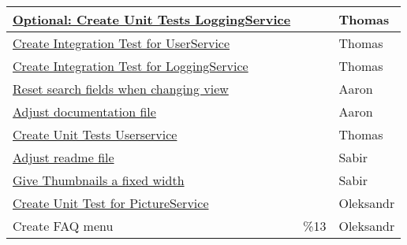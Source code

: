 \begin{tabular}{|p{}|p{1cm}|p{}|}
    \hline
	\href{https://gitlab.rz.uni-bamberg.de/swt/teaching/2021-ws/swt-swl-b/group-a/-/issues/138}{Optional: Create Unit Tests LoggingService} &   & Thomas \\

    \hline
	\href{https://gitlab.rz.uni-bamberg.de/swt/teaching/2021-ws/swt-swl-b/group-a/-/issues/166}{Create Integration Test for UserService} &   & Thomas \\

    \hline
	\href{https://gitlab.rz.uni-bamberg.de/swt/teaching/2021-ws/swt-swl-b/group-a/-/issues/162}{Create Integration Test for LoggingService} &   & Thomas \\

    \hline
	\href{https://gitlab.rz.uni-bamberg.de/swt/teaching/2021-ws/swt-swl-b/group-a/-/issues/148}{Reset search fields when changing view} &   & Aaron \\

    \hline
	\href{https://gitlab.rz.uni-bamberg.de/swt/teaching/2021-ws/swt-swl-b/group-a/-/issues/42}{Adjust documentation file} &   & Aaron \\

    \hline
	\href{https://gitlab.rz.uni-bamberg.de/swt/teaching/2021-ws/swt-swl-b/group-a/-/issues/72}{Create Unit Tests Userservice} &   & Thomas \\

    \hline
	\href{https://gitlab.rz.uni-bamberg.de/swt/teaching/2021-ws/swt-swl-b/group-a/-/issues/44}{Adjust readme file} &   & Sabir \\

    \hline
	\href{https://gitlab.rz.uni-bamberg.de/swt/teaching/2021-ws/swt-swl-b/group-a/-/issues/156}{Give Thumbnails a fixed width} &   & Sabir \\

    \hline
	\href{https://gitlab.rz.uni-bamberg.de/swt/teaching/2021-ws/swt-swl-b/group-a/-/issues/119}{Create Unit Test for PictureService} &   & Oleksandr \\
    \hline

	{Create FAQ menu} & \%13  & Oleksandr \\
    \hline

\end{tabular}